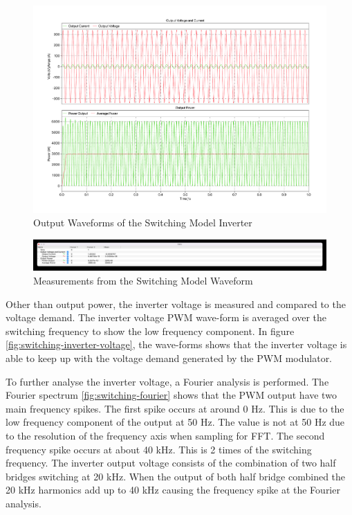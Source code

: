 \documentclass[12pt]{article}
\begin{document}
\begin{figure}[ht]
    \centering{}
    \includegraphics[width=\textwidth, height=0.4\textheight, keepaspectratio]{img/Switching Power.pdf}
    \caption{Output Waveforms of the Switching Model Inverter}
    \label{fig:switching-waveform}
\end{figure}

\begin{figure}[ht]
    \centering{}
    \includegraphics[width=\textwidth, height=0.4\textheight, keepaspectratio]{img/Switching Power Cursor.jpg}
    \caption{Measurements from the Switching Model Waveform}
    \label{fig:switching-cursor}
\end{figure}

Other than output power, the inverter voltage is measured and compared to the voltage demand.
The inverter voltage PWM wave-form is averaged over the switching frequency to show the low frequency component.
In figure \ref{fig:switching-inverter-voltage}, the wave-forms shows that the inverter voltage is able to keep up with the voltage demand generated by the PWM modulator.

To further analyse the inverter voltage, a Fourier analysis is performed.
The Fourier spectrum \ref{fig:switching-fourier} shows that the PWM output have two main frequency spikes.
The first spike occurs at around 0 Hz.
This is due to the low frequency component of the output at 50 Hz.
The value is not at 50 Hz due to the resolution of the frequency axis when sampling for FFT.
The second frequency spike occurs at about 40 kHz.
This is 2 times of the switching frequency.
The inverter output voltage consists of the combination of two half bridges switching at 20 kHz.
When the output of both half bridge combined the 20 kHz harmonics add up to 40 kHz causing the frequency spike at the Fourier analysis.
\end{document}
